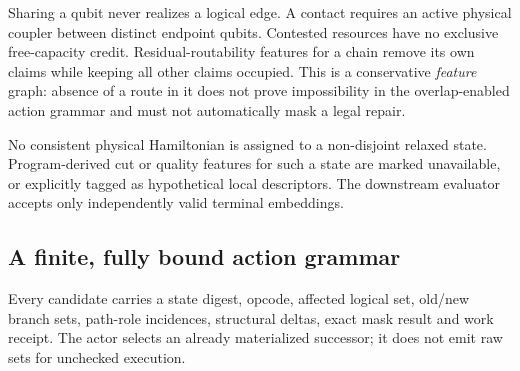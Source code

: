 Sharing a qubit never realizes a logical edge. A contact requires an active physical coupler between distinct endpoint qubits. Contested resources have no exclusive free-capacity credit. Residual-routability features for a chain remove its own claims while keeping all other claims occupied. This is a conservative \emph{feature} graph: absence of a route in it does not prove impossibility in the overlap-enabled action grammar and must not automatically mask a legal repair.

No consistent physical Hamiltonian is assigned to a non-disjoint relaxed state. Program-derived cut or quality features for such a state are marked unavailable, or explicitly tagged as hypothetical local descriptors. The downstream evaluator accepts only independently valid terminal embeddings.

\subsection{A finite, fully bound action grammar}
Every candidate carries a state digest, opcode, affected logical set, old/new branch sets, path-role incidences, structural deltas, exact mask result and work receipt. The actor selects an already materialized successor; it does not emit raw sets for unchecked execution.

